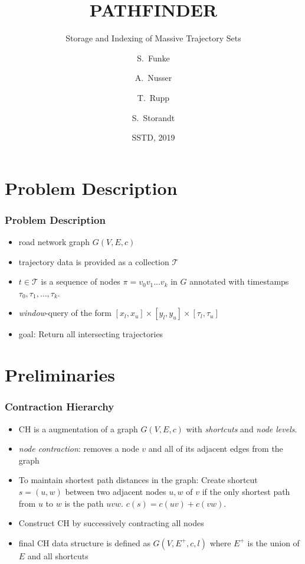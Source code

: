 \documentclass{beamer}
\title[Pathfinder] %
{PATHFINDER}
\subtitle{Storage and Indexing of Massive Trajectory Sets}
\author[Funke, Nusser, Rupp, Storandt] %
{S.~Funke\inst{1} \and A.~Nusser\inst{2} \and T.~Rupp\inst{3} \and S.~Storandt\inst{4}}
\institute[Universities] %
{
	\inst{1}%
	University of Stuttgart
	\and
	\inst{2}%
	Max Planck Institute for Informatics
	\and
	\inst{3}%
	University of Stuttgart
	\and
	\inst{4}%
	University of Konstanz
}
\date[SSTD 2019] %
{SSTD, 2019}
\begin{document}
\frame{\titlepage}

\frame{\tableofcontents[
		currentsection,
		currentsubsection,
		subsectionstyle=show/shaded/hide
	]}

\section{Problem Description}
\begin{frame}
	\frametitle{Problem Description}
	\begin{itemize}
		\item<1-> road network graph $G(V,E,c)$
		\item<2-> trajectory data is provided as a collection $\mathcal{T}$
		\item<3-> $t\in \mathcal{T}$ is a sequence of nodes $\pi=v_0 v_1 \dots v_k$ in  $G$ annotated with timestamps $\tau_0, \tau_1, \dots, \tau_k$.
		\item<4-> \emph{window}-query of the form $[x_l, x_u]\times[y_l, y_u]\times[\tau_l, \tau_u]$
		\item<5-> goal: Return all intersecting trajectories
	\end{itemize}
\end{frame}

\section{Preliminaries}
\begin{frame}
	\frametitle{Contraction Hierarchy}
	\begin{itemize}
		\item<1-> CH is a augmentation of a graph $G(V,E,c)$ with \emph{shortcuts} and \emph{node levels}.
		\item<2-> \emph{node contraction}: removes a node $v$ and all of its adjacent edges from the graph
		\item<3-> To maintain shortest path distances in the graph: Create shortcut $s = (u, w)$ between two adjacent nodes $u,w$ of $v$ if the only shortest path from $u$ to $w$ is the path $uvw$. $c(s) = c(uv) + c(vw)$.
		\item<4-> Construct CH by successively contracting all nodes
		\item<5-> final CH data structure is defined as $G(V, E^+, c, l)$ where $E^+$ is the union of $E$ and all shortcuts
	\end{itemize}
\end{frame}
\end{document}
